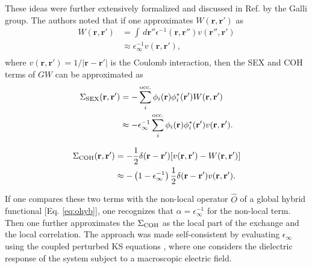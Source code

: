 \documentclass[aip, amsmath, amssymb, reprint, longbibliography]{revtex4-2}
\def\mr{\mathbf{r}}
\begin{document}
These ideas were further extensively formalized and discussed in Ref.  by the Galli group. The authors noted that if one approximates $W(\mr,\mr')$ as
\begin{equation}
\begin{split}
W(\mr,\mr') & = \int \,d\mr'' \epsilon^{-1}(\mr,\mr'')v(\mr'',\mr') \\
& \approx \epsilon_\infty^{-1} v(\mr,\mr'), \\
\end{split}
\label{eq:sgg14a}
\end{equation}
where $v(\mr,\mr')=1/|\mr-\mr'|$ is the Coulomb interaction, then the SEX and COH terms of $GW$ can be approximated as
\begin{equation}
\begin{split}
\Sigma_{\rm SEX}(\mr,\mr') & =-\sum_{i}^{{\rm occ.}}\phi_i(\mr)\phi_i^*(\mr')W(\mr,\mr') \\
& \approx -\epsilon_\infty^{-1} \sum_{i}^{{\rm occ.}}\phi_i(\mr)\phi_i^*(\mr')v(\mr,\mr').
\end{split}
\label{eq:sgg14b}
\end{equation}

\begin{equation}
\begin{split}
\Sigma_{\rm COH}(\mr,\mr') & = -\frac{1}{2}\delta(\mr-\mr')[v(\mr,\mr')-W(\mr,\mr')] \\
& \approx -\left(1-\epsilon_\infty^{-1}\right)\frac{1}{2}\delta(\mr-\mr')v(\mr,\mr').
\end{split}
\label{eq:sgg14c}
\end{equation}

If one compares these two terms with the non-local operator $\hat{O}$ of a global hybrid functional [Eq. \eqref{eq:ohyb}], one recognizes that $\alpha=\epsilon_\infty^{-1}$ for the non-local term. Then one further approximates the $\Sigma_{\rm COH}$ as the local part of the exchange and the local correlation. The approach was made self-consistent by evaluating $\epsilon_\infty$ using the coupled perturbed KS equations \cite{FROD08}, where one considers the dielectric response of the system subject to a macroscopic electric field.
\end{document}
